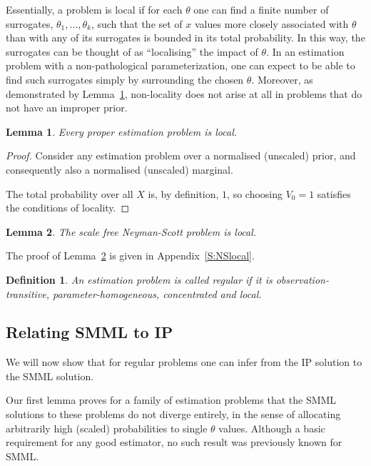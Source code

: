\documentclass{IEEEtran}
\newtheorem{lemma}{Lemma}
\newtheorem{defi}{Definition}
\begin{document}
Essentially, a problem is local if for each $\theta$ one can find a finite
number of surrogates, $\theta_1,\ldots,\theta_k$, such that the set of $x$
values more closely associated with $\theta$ than with any of its surrogates
is bounded in its total probability. In this way, the surrogates can be
thought of as ``localising'' the impact of $\theta$.
In an estimation problem with a
non-pathological parameterization, one can expect to be able to find such
surrogates simply by surrounding the chosen $\theta$. Moreover, as
demonstrated by Lemma~\ref{L:properlocal}, non-locality does not arise at
all in problems that do not have an improper prior.

\begin{lemma}\label{L:properlocal}
Every proper estimation problem is local.
\end{lemma}

\begin{proof}
Consider any estimation problem over a normalised (unscaled) prior, and
consequently also a normalised (unscaled) marginal.

The total probability over all $X$ is, by definition, $1$, so choosing
$V_0=1$ satisfies the conditions of locality.
\end{proof}

\begin{lemma}\label{L:NSlocal}
The scale free Neyman-Scott problem is local.
\end{lemma}

The proof of Lemma~\ref{L:NSlocal} is given in Appendix~\ref{S:NSlocal}.

\begin{defi}
An estimation problem is called \emph{regular} if it is
observation-transitive, parameter-homogeneous, concentrated and local.
\end{defi}

\subsection{Relating SMML to IP}\label{SS:SMML_IP}

We will now show that for regular problems
one can infer from the IP solution to the SMML solution.

Our first lemma proves for a family of estimation problems that the
SMML solutions to these problems do not diverge entirely, in the sense of
allocating arbitrarily high (scaled) probabilities to single $\theta$ values.
Although a basic requirement for any good estimator, no such result was
previously known for SMML.
\end{document}
